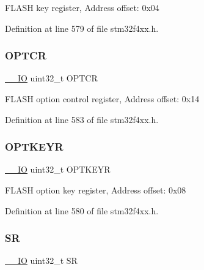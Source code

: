 F\+L\+A\+SH key register, Address offset\+: 0x04 

Definition at line 579 of file stm32f4xx.\+h.

\mbox{\label{struct_f_l_a_s_h___type_def_acfef9b6d7da4271943edc04d7dfdf595}} 
\subsubsection{\texorpdfstring{O\+P\+T\+CR}{OPTCR}}
{\footnotesize\ttfamily \hyperlink{group___c_m_s_i_s__core__definitions_gaec43007d9998a0a0e01faede4133d6be}{\+\_\+\+\_\+\+IO} uint32\+\_\+t O\+P\+T\+CR}

F\+L\+A\+SH option control register, Address offset\+: 0x14 

Definition at line 583 of file stm32f4xx.\+h.

\mbox{\label{struct_f_l_a_s_h___type_def_afc4900646681dfe1ca43133d376c4423}} 
\subsubsection{\texorpdfstring{O\+P\+T\+K\+E\+YR}{OPTKEYR}}
{\footnotesize\ttfamily \hyperlink{group___c_m_s_i_s__core__definitions_gaec43007d9998a0a0e01faede4133d6be}{\+\_\+\+\_\+\+IO} uint32\+\_\+t O\+P\+T\+K\+E\+YR}

F\+L\+A\+SH option key register, Address offset\+: 0x08 

Definition at line 580 of file stm32f4xx.\+h.

\mbox{\label{struct_f_l_a_s_h___type_def_af6aca2bbd40c0fb6df7c3aebe224a360}} 
\subsubsection{\texorpdfstring{SR}{SR}}
{\footnotesize\ttfamily \hyperlink{group___c_m_s_i_s__core__definitions_gaec43007d9998a0a0e01faede4133d6be}{\+\_\+\+\_\+\+IO} uint32\+\_\+t SR}

